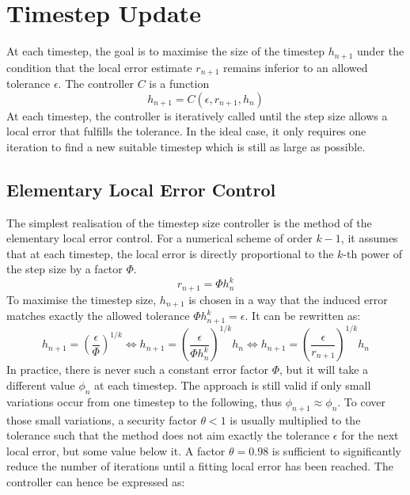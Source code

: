 \section{Timestep Update}
At each timestep, the goal is to maximise the size of the timestep $h_{n+1}$ under the condition that the local error  estimate $r_{n+1}$ remains inferior to an allowed tolerance $\epsilon$. The controller $C$ is a function 
\begin{equation}
h_{n+1} = C(\epsilon, r_{n+1},h_n)
\end{equation}
At each timestep, the controller is iteratively called until the step size allows a local error that fulfills the tolerance. In the ideal case, it only requires one iteration to find a new suitable timestep which is still as large as possible.

\subsection{Elementary Local Error Control}
The simplest realisation of the timestep size controller is the method of the elementary local error control. For a numerical scheme of order $k-1$, it assumes that at each timestep, the local error is directly proportional to the $k$-th power of the step size by a factor $\Phi$. 
\begin{equation}
    \label{eq:asymptoticAssumptionELEC}
    r_{n+1} = \Phi h_n^k 
\end{equation}
To maximise the timestep size, $h_{n+1}$ is chosen in a way that the induced error matches exactly the allowed tolerance $\Phi h_{n+1}^k = \epsilon$. It can be rewritten as:
\begin{equation}
    h_{n+1} = \left(\frac{\epsilon}{\Phi}\right)^{1/k}
    \Leftrightarrow 
    h_{n+1} = \left(\frac{\epsilon}{\Phi h_n^k}\right)^{1/k}h_n
    \Leftrightarrow
    h_{n+1} = \left(\frac{\epsilon}{r_{n+1}}\right)^{1/k}h_n
\end{equation}
In practice, there is never such a constant error factor $\Phi$, but it will take a different value $\phi_n$ at each timestep. The approach is still valid if only small variations occur from one timestep to the following, thus $\phi_{n+1} \approx \phi_n$. To cover those small variations, a security factor $\theta < 1$ is usually multiplied to the tolerance such that the method does not aim exactly the tolerance $\epsilon$ for the next local error, but some value below it. A factor $\theta=0.98$ is sufficient to significantly reduce the number of iterations until a fitting local error has been reached. The controller can hence be expressed as:

